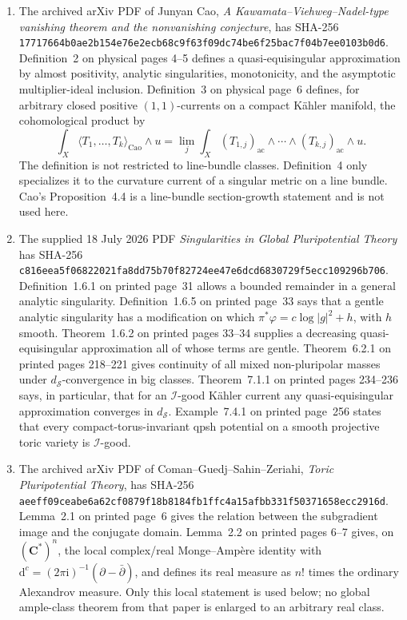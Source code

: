 \begin{enumerate}
\item The archived arXiv PDF of Junyan Cao,
\emph{A Kawamata--Viehweg--Nadel-type vanishing theorem and the
nonvanishing conjecture}, has SHA-256
\texttt{17717664b0ae2b154e76e2ecb68c9f63f09dc74be6f25bac7f04b7ee0103b0d6}.
Definition~2 on physical pages 4--5 defines a quasi-equisingular
approximation by almost positivity, analytic singularities, monotonicity,
and the asymptotic multiplier-ideal inclusion.  Definition~3 on physical
page~6 defines, for arbitrary closed positive \((1,1)\)-currents on a compact
K\"ahler manifold, the cohomological product by
\[
 \int_X\langle T_1,\ldots,T_k\rangle_{\mathrm{Cao}}\wedge u
 =\lim_j\int_X (T_{1,j})_{\mathrm{ac}}\wedge\cdots\wedge
                  (T_{k,j})_{\mathrm{ac}}\wedge u.
\]
The definition is not restricted to line-bundle classes.  Definition~4 only
specializes it to the curvature current of a singular metric on a line
bundle.  Cao's Proposition~4.4 is a line-bundle section-growth statement and
is not used here.

\item The supplied 18 July 2026 PDF
\emph{Singularities in Global Pluripotential Theory} has SHA-256
\texttt{c816eea5f06822021fa8dd75b70f82724ee47e6dcd6830729f5ecc109296b706}.
Definition~1.6.1 on printed page~31 allows a bounded remainder in a general
analytic singularity.  Definition~1.6.5 on printed page~33 says that a
gentle analytic singularity has a modification on which
\(\pi^*\varphi=c\log|g|^2+h\), with \(h\) smooth.  Theorem~1.6.2 on printed
pages 33--34 supplies a decreasing quasi-equisingular approximation all of
whose terms are gentle.  Theorem~6.2.1 on printed pages 218--221 gives
continuity of all mixed non-pluripolar masses under
\(d_{\mathcal S}\)-convergence in big classes.  Theorem~7.1.1 on printed
pages 234--236 says, in particular, that for an \(\mathcal I\)-good K\"ahler
current any quasi-equisingular approximation converges in
\(d_{\mathcal S}\).  Example~7.4.1 on printed page~256 states that every
compact-torus-invariant qpsh potential on a smooth projective toric variety
is \(\mathcal I\)-good.

\item The archived arXiv PDF of Coman--Guedj--Sahin--Zeriahi,
\emph{Toric Pluripotential Theory}, has SHA-256
\texttt{aeeff09ceabe6a62cf0879f18b8184fb1ffc4a15afbb331f50371658ecc2916d}.
Lemma~2.1 on printed page~6 gives the relation between the subgradient image
and the conjugate domain.  Lemma~2.2 on printed pages 6--7 gives, on
\((\mathbf C^*)^n\), the local complex/real Monge--Amp\`ere identity with
\(\mathrm d^c=(2\pi\mathrm i)^{-1}(\partial-\bar\partial)\), and defines its
real measure as \(n!\) times the ordinary Alexandrov measure.  Only this
local statement is used below; no global ample-class theorem from that paper
is enlarged to an arbitrary real class.


\end{enumerate}
